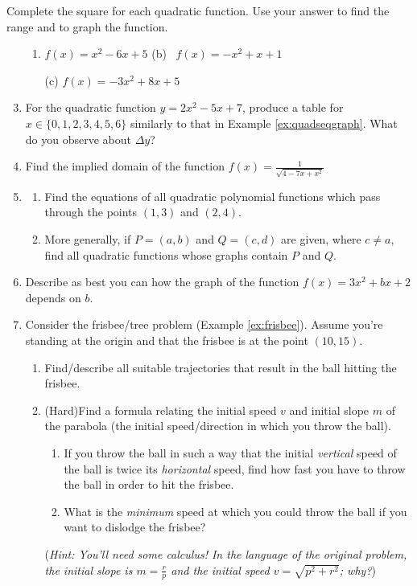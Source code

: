 \begin{exercises}{}{}
	\exstart Complete the square for each quadratic function. Use your answer to find the range and to graph the function.
	\begin{enumerate}\setcounter{enumi}{1}  
	  \item[]\begin{enumerate}
	    \item $f(x)=x^2-6x+5$ %
	    \qquad\qquad
	    (b) \ $f(x)=-x^2+x+1$ %
	    \item[(c)] $f(x)=-3x^2+8x+5$ %
	  \end{enumerate}
	 
	  
	  \item For the quadratic function $y=2x^2-5x+7$, produce a table for $x\in\{0,1,2,3,4,5,6\}$ similarly to that in Example \ref{ex:quadseqgraph}. What do you observe about $\Delta y$?
	  
	  
	  
	  \item Find the implied domain of the function $f(x)=\frac 1{\sqrt{4-7x+x^2}}$
	  
	  
		\item\begin{enumerate}
		  \item Find the equations of all quadratic polynomial functions which pass through the points $(1,3)$ and $(2,4)$.
			\item More generally, if $P=(a,b)$ and $Q=(c,d)$ are given, where $c\neq a$, find all quadratic functions whose graphs contain $P$ and $Q$.
		\end{enumerate}
		
		
		\item Describe as best you can how the graph of the function $f(x)=3x^2+bx+2$ depends on $b$.
	  
	  \item\label{exs:frisbee} Consider the frisbee/tree problem (Example \ref{ex:frisbee}). Assume you're standing at the origin and that the frisbee is at the point $(10,15)$.
	  \begin{enumerate}
	    \item  Find/describe all suitable trajectories that result in the ball hitting the frisbee.
	    \item (Hard)\lstsp Find a formula relating the initial speed $v$ and initial slope $m$ of the parabola (the initial speed/direction in which you throw the ball).
	    \begin{enumerate}
				\item If you throw the ball in such a way that the initial \emph{vertical} speed of the ball is twice its \emph{horizontal} speed, find how fast you have to throw the ball in order to hit the frisbee.
	      \item What is the \emph{minimum} speed at which you could throw the ball if you want to dislodge the frisbee?
	    \end{enumerate}
	    (\emph{Hint: You'll need some calculus! In the language of the original problem, the initial slope is $m=\frac rp$ and the initial speed $v=\sqrt{p^2+r^2}$; why?})
		\end{enumerate}


\end{enumerate}
\end{exercises}
